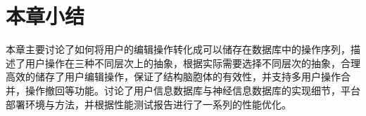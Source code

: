 \section{本章小结}
本章主要讨论了如何将用户的编辑操作转化成可以储存在数据库中的操作序列，描述了用户操作在三种不同层次上的抽象，根据实际需要选择不同层次的抽象，合理高效的储存了用户编辑操作，保证了结构脑胞体的有效性，并支持多用户操作合并，操作撤回等功能。讨论了用户信息数据库与神经信息数据库的实现细节，平台部署环境与方法，并根据性能测试报告进行了一系列的性能优化。
